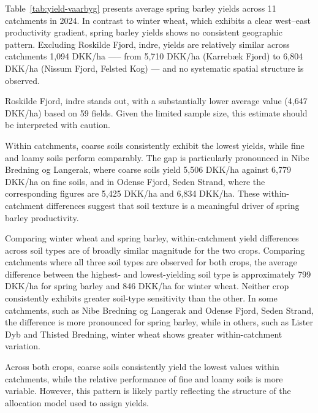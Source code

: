 \documentclass[12pt]{article}
\begin{document}
Table~\ref{tab:yield-vaarbyg} presents average spring barley yields across 11 catchments in 2024. In contrast to winter wheat, which exhibits a clear west–east productivity gradient, spring barley yields shows no consistent geographic pattern. Excluding Roskilde Fjord, indre, yields are relatively similar across catchments 1,094 DKK/ha —-- from 5,710 DKK/ha (Karrebæk Fjord) to 6,804 DKK/ha (Nissum Fjord, Felsted Kog) --- and no systematic spatial structure is observed.

Roskilde Fjord, indre stands out, with a substantially lower average value (4,647 DKK/ha) based on 59 fields. Given the limited sample size, this estimate should be interpreted with caution.

Within catchments, coarse soils consistently exhibit the lowest yields, while fine and loamy soils perform comparably. The gap is particularly pronounced in Nibe Bredning og Langerak, where coarse soils yield 5,506 DKK/ha against 6,779 DKK/ha on fine soils, and in Odense Fjord, Seden Strand, where the corresponding figures are 5,425 DKK/ha and 6,834 DKK/ha. These within-catchment differences suggest that soil texture is a meaningful driver of spring barley productivity. 


Comparing winter wheat and spring barley, within-catchment yield differences across soil types are of broadly similar magnitude for the two crops. 
Comparing catchments where all three soil types are observed for both crops, the average difference between the highest- and lowest-yielding soil type is approximately 799 DKK/ha for spring barley and 846 DKK/ha for winter wheat. Neither crop consistently exhibits greater soil-type sensitivity than the other. In some catchments, such as Nibe Bredning og Langerak and Odense Fjord, Seden Strand, the difference is more pronounced for spring barley, while in others, such as Lister Dyb and Thisted Bredning, winter wheat shows greater within-catchment variation. 

Across both crops, coarse soils consistently yield the lowest values within catchments, while the relative performance of fine and loamy soils is more variable. However, this pattern is likely partly reflecting the structure of the allocation model used to assign yields.
\end{document}
